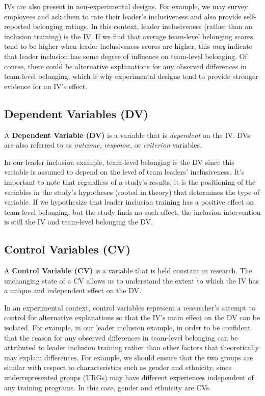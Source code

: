 \documentclass[]{book}
\begin{document}
IVs are also present in non-experimental designs. For example, we may survey employees and ask them to rate their leader's inclusiveness and also provide self-reported belonging ratings. In this context, leader inclusiveness (rather than an inclusion training) is the IV. If we find that average team-level belonging scores tend to be higher when leader inclusiveness scores are higher, this \emph{may} indicate that leader inclusion has some degree of influence on team-level belonging. Of course, there could be alternative explanations for any observed differences in team-level belonging, which is why experimental designs tend to provide stronger evidence for an IV's effect.

\hypertarget{dependent-variables-dv}{%
\subsection{Dependent Variables (DV)}\label{dependent-variables-dv}}

A \textbf{Dependent Variable (DV)} is a variable that is \emph{dependent} on the IV. DVs are also referred to as \emph{outcome}, \emph{response}, or \emph{criterion} variables.

In our leader inclusion example, team-level belonging is the DV since this variable is assumed to depend on the level of team leaders' inclusiveness. It's important to note that regardless of a study's results, it is the positioning of the variables in the study's hypotheses (rooted in theory) that determines the type of variable. If we hypothesize that leader inclusion training has a positive effect on team-level belonging, but the study finds no such effect, the inclusion intervention is still the IV and team-level belonging the DV.

\hypertarget{control-variables-cv}{%
\subsection{Control Variables (CV)}\label{control-variables-cv}}

A \textbf{Control Variable (CV)} is a variable that is held constant in research. The unchanging state of a CV allows us to understand the extent to which the IV has a unique and independent effect on the DV.

In an experimental context, control variables represent a researcher's attempt to control for alternative explanations so that the IV's main effect on the DV can be isolated. For example, in our leader inclusion example, in order to be confident that the reason for any observed differences in team-level belonging can be attributed to leader inclusion training rather than other factors that theoretically may explain differences. For example, we should ensure that the two groups are similar with respect to characteristics such as gender and ethnicity, since underrepresented groups (URGs) may have different experiences independent of any training programs. In this case, gender and ethnicity are CVs.
\end{document}
